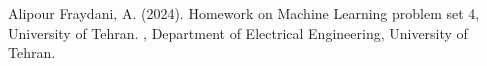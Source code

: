 \documentclass[DIV=calc, paper=a4, fontsize=11pt, twocolumn]{scrartcl}	 %
\begin{document}

\begin{thebibliography}{99} %

  Alipour Fraydani, A. (2024).
  \newblock Homework on Machine Learning problem set 4, University of Tehran.
  , Department of Electrical Engineering, University of Tehran.
  
\end{thebibliography}

\end{document}
